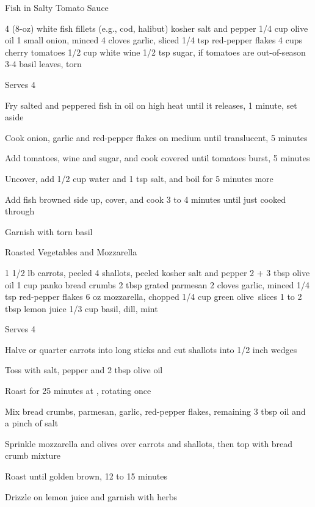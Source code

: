 \begin{denserecipe}{Fish in Salty Tomato Sauce}{}
\begin{ingredients}
4 (8-oz) white fish fillets (e.g., cod, halibut)
kosher salt and pepper
1/4 cup olive oil
1 small onion, minced
4 cloves garlic, sliced
1/4 tsp red-pepper flakes
4 cups cherry tomatoes
1/2 cup white wine
1/2 tsp sugar, if tomatoes are out-of-season
3-4 basil leaves, torn
\end{ingredients}
\nextcolumn
Serves 4
\begin{steps}
\item Fry salted and peppered fish in oil on high heat until it releases, 1 minute, set aside
\item Cook onion, garlic and red-pepper flakes on medium until translucent, 5 minutes
\item Add tomatoes, wine and sugar, and cook covered until tomatoes burst, 5 minutes
\item Uncover, add 1/2 cup water and 1 tsp salt, and boil for 5 minutes more
\item Add fish browned side up, cover, and cook 3 to 4 minutes until just cooked through
\item Garnish with torn basil
\end{steps}
\end{denserecipe}

\begin{denserecipe}{Roasted Vegetables and Mozzarella}{}
\begin{ingredients}
1 1/2 lb carrots, peeled
4 shallots, peeled
kosher salt and pepper
2 + 3 tbsp olive oil
1 cup panko bread crumbs
2 tbsp grated parmesan
2 cloves garlic, minced
1/4 tsp red-pepper flakes
6 oz mozzarella, chopped
1/4 cup green \mbox{olive slices}
1 to 2 tbsp lemon juice
1/3 cup basil, dill, mint
\end{ingredients}
\nextcolumn
Serves 4
\begin{steps}
\item Halve or quarter carrots into long sticks and cut shallots into 1/2 inch wedges
\item Toss with salt, pepper and 2 tbsp olive oil
\item Roast for 25 minutes at , rotating once
\item Mix bread crumbs, parmesan, garlic, red-pepper flakes, remaining 3 tbsp oil and a pinch of salt
\item Sprinkle mozzarella and olives over carrots and shallots, then top with bread crumb mixture
\item Roast until golden brown, 12 to 15 minutes
\item Drizzle on lemon juice and garnish with herbs
\end{steps}
\end{denserecipe}

